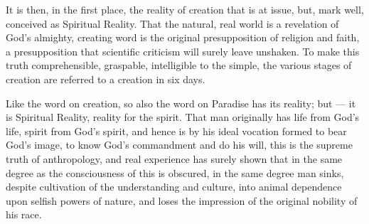 \documentclass[12pt,a4paper,openany]{book}
\begin{document}
It is then, in the first place, the reality of creation
that is at issue, but, mark well, conceived as
Spiritual Reality. That the natural, real world
is a revelation of God's almighty, creating word
is the original presupposition of religion and faith, a
presupposition that scientific criticism will surely
leave unshaken. To make this truth comprehensible, graspable,
intelligible to the simple, the various
stages of creation are referred to a creation in six days.

Like the word on creation, so also
the word on Paradise has its reality; but --- it is Spiritual Reality,
reality for the spirit. That man originally
has life from God's life, spirit from God's spirit, and
hence is by his ideal vocation formed to bear
God's image, to know God's commandment and do his will,
this is the supreme truth of anthropology, and real
experience has surely shown that in the same degree as
the consciousness of this is obscured, in the same degree man sinks,
despite cultivation of the understanding and culture, into
animal dependence upon selfish powers of nature, and loses
the impression of the original nobility of his race.
\end{document}
